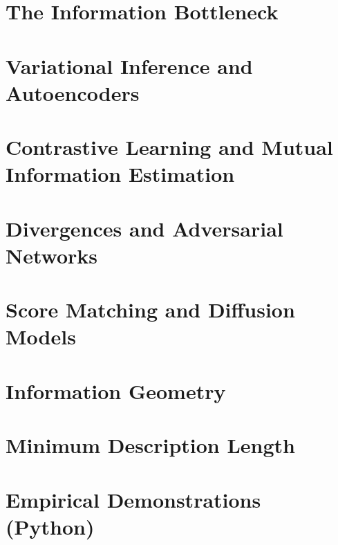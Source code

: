 \documentclass[11pt,twoside,openright]{book}
\begin{document}
\part{The Information Bottleneck}





\part{Variational Inference and Autoencoders}





\part{Contrastive Learning and Mutual Information Estimation}






\part{Divergences and Adversarial Networks}





\part{Score Matching and Diffusion Models}





\part{Information Geometry}




\part{Minimum Description Length}




\part{Empirical Demonstrations (Python)}





\backmatter


\end{document}
